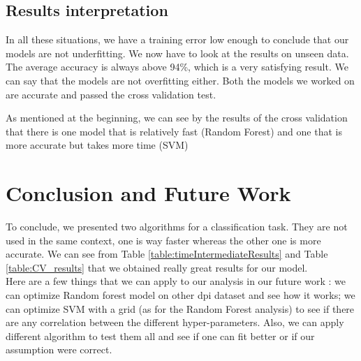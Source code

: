 \documentclass[conference]{IEEEtran}
\begin{document}
\subsection{Results interpretation}

\textcolor{baptiste}{In all these situations, we have a training error low enough to conclude that our models are not underfitting. We now have to look at the results on unseen data. The average accuracy is always above 94\%, which is a very satisfying result. We can say that the models are not overfitting either. Both the models we worked on are accurate and passed the cross validation test.}

\textcolor{baptiste}{As mentioned at the beginning, we can see by the results of the cross validation that there is one model that is relatively fast (Random Forest) and one that is more accurate but takes more time (SVM)}

\section{Conclusion and Future Work}
To conclude, we presented two algorithms for a classification task. They are not used in the same context, one is way faster whereas the other one is more accurate. We can see from Table \ref{table:timeIntermediateResults} and Table \ref{table:CV_results} that we obtained really great results for our model.\\
Here are a few things that we can apply to our analysis in our future work : we can optimize Random forest model on other dpi dataset and see how it works; we can optimize SVM with a grid (as for the Random Forest analysis) to see if there are any correlation between the different hyper-parameters. Also, we can apply different algorithm to test them all and see if one can fit better or if our assumption were correct.




\end{document}
